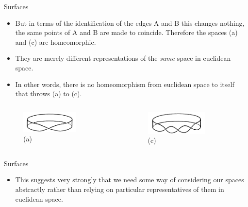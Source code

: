 \documentclass{beamer}
\begin{document}
\begin{frame}{Surfaces}
  \begin{block}{}
    \begin{itemize}
    \item But in terms of the identification of the edges A and B this changes nothing, the same points of A and B are made to coincide. Therefore the spaces (a) and (c) are homeomorphic.
    \item They are merely different representations of the \textsl{same} space in euclidean space.
    \item In other words, there is no homeomorphism from euclidean space to itself that throws (a) to (c).
    \end{itemize}
  \end{block}
  \begin{columns}
    \begin{column}{0.5\textwidth}
      \begin{figure}
        \centering
        \includegraphics[width=0.7\textwidth]{figure_1_14_a.png}
        \caption{(a)}
      \end{figure}
    \end{column}
    \begin{column}{0.5\textwidth}
      \begin{figure}
        \centering
        \includegraphics[width=0.7\textwidth]{figure_1_14_c.png}
        \caption{(c)}
      \end{figure}
    \end{column}
  \end{columns}
\end{frame}

\begin{frame}{Surfaces}
  \begin{block}{}
    \begin{itemize}
    \item This suggests very strongly that we need some way of considering our spaces abstractly rather than relying on particular representatives of them in euclidean space.
    \end{itemize}
  \end{block}
\end{frame}
\end{document}

